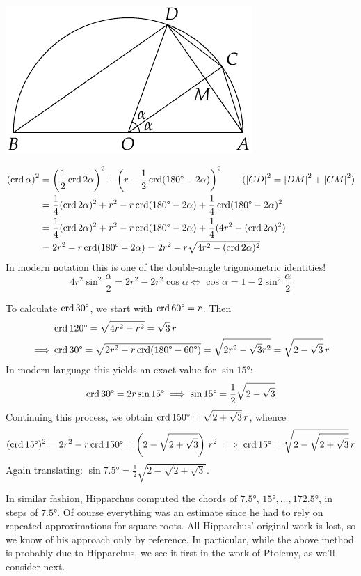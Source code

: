 \hfill
\begin{minipage}[t]{0.39\linewidth}\vspace{0pt}
	\flushright\includegraphics[scale=0.95]{trig-double}
\end{minipage}
\begin{align*}
	\left(\crd\alpha\right)^2&=\left(\frac 12\crd 2\alpha\right)^2+\left(r-\frac 12\crd(\ang{180}-2\alpha)\right)^2 \tag{$\nm{CD}^2=\nm{DM}^2+\nm{CM}^2$}\\
	&=\frac 14(\crd 2\alpha)^2+r^2-r\crd(\ang{180}-2\alpha)+\frac 14\crd(\ang{180}-2\alpha)^2\\
	&=\frac 14(\crd 2\alpha)^2+r^2-r\crd(\ang{180}-2\alpha)+\frac 14(4r^2-(\crd 2\alpha)^2)\\
	&=2r^2-r\crd(\ang{180}-2\alpha) =2r^2-r\sqrt{4r^2-(\crd 2\alpha)^2}
\end{align*}
In modern notation this is one of the double-angle trigonometric identities!
\[
	4r^2\sin^2\frac\alpha 2 =2r^2-2r^2\cos\alpha\iff \cos\alpha=1-2\sin^2\frac\alpha 2
\]
\goodbreak


 To calculate $\crd \ang{30}$, we start with $\crd\ang{60}=r$. Then
\begin{align*}
	&\crd\ang{120} =\sqrt{4r^2-r^2} =\sqrt 3\,r\\
	\implies &\crd\ang{30} =\sqrt{2r^2-r\crd(\ang{180}-\ang{60})}
		=\sqrt{2r^2-\sqrt 3r^2} =\sqrt{2-\sqrt 3}\,r
\end{align*}
In modern language this yields an exact value for $\sin\ang{15}$:
\[
	\crd\ang{30} =2r\sin\ang{15}
	\implies\sin\ang{15} =\frac 12\sqrt{2-\sqrt 3}
\]
Continuing this process, we obtain $\crd \ang{150}=\sqrt{2+\sqrt 3}\,r$, whence
\[
	(\crd\ang{15})^2 =2r^2-r\crd\ang{150}
	=\left(2-\sqrt{2+\sqrt 3}\right)\,r^2
	\implies \crd\ang{15} =\sqrt{2-\sqrt{2+\sqrt 3}}\,r
\]
Again translating: $\sin\ang{7.5}=\frac 12\sqrt{2-\sqrt{2+\sqrt 3}}$.\smallbreak

In similar fashion, Hipparchus computed the chords of $\ang{7.5}$, $\ang{15},\ldots,\ang{172.5}$, in steps of $\ang{7.5}$. Of course everything was an estimate since he had to rely on repeated approximations for square-roots. All Hipparchus' original work is lost, so we know of his approach only by reference. In particular, while the above method is probably due to Hipparchus, we see it first in the work of Ptolemy, as we'll consider next.



